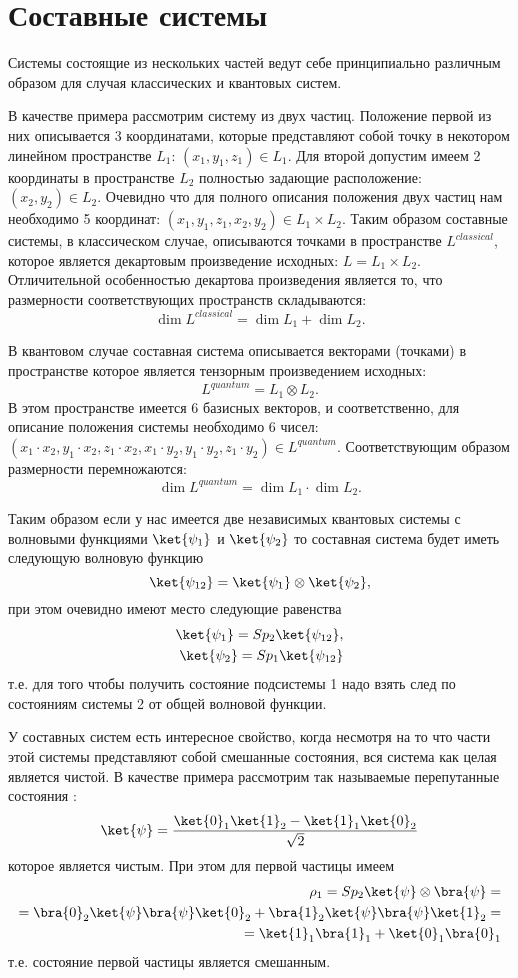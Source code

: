\section{Составные системы}
\label{sec:add:quantum:composite}
Системы состоящие из нескольких частей ведут себе принципиально
различным образом для случая классических и квантовых систем.


В качестве примера рассмотрим систему из двух частиц. Положение первой
из них описывается 3 координатами, которые представляют собой точку в
некотором линейном пространстве $L_1$: $(x_1, y_1, z_1) \in L_1$. Для второй
допустим имеем 2 координаты в пространстве $L_2$ полностью задающие
расположение:  
$(x_2, y_2) \in L_2$. Очевидно что для полного описания положения двух
частиц нам необходимо 5 координат: $(x_1, y_1, z_1, x_2, y_2) \in L_1
\times L_2$. Таким образом составные системы, в классическом случае,
описываются точками в пространстве $L^{classical}$, которое является декартовым
произведение исходных: $L = L_1 \times L_2$. Отличительной
особенностью декартова произведения является то, что размерности
соответствующих пространств складываются:
\[
\dim{L^{classical}} = \dim{L_1} + \dim{L_2}.
\] 

В квантовом случае составная система описывается векторами (точками) в
пространстве которое является тензорным произведением исходных: 
\[
L^{quantum} = L_1 \otimes L_2.
\]
В этом пространстве имеется 6 базисных векторов, и соответственно, для
описание положения системы необходимо 6 чисел:
$(x_1 \cdot x_2, y_1 \cdot x_2, z_1 \cdot x_2, 
x_1 \cdot y_2, y_1 \cdot y_2, z_1 \cdot y_2) \in L^{quantum}$. 
Соответствующим образом размерности перемножаются:
\[
\dim{L^{quantum}} = \dim{L_1} \cdot \dim{L_2}.
\] 

Таким образом если у нас имеется две независимых квантовых системы с
волновыми функциями $\ket{\psi_1}$ и $\ket{\psi_2}$ то составная
система будет иметь следующую волновую функцию
\[
\ket{\psi_{12}} = \ket{\psi_1} \otimes \ket{\psi_2},
\]
при этом очевидно имеют место следующие равенства 
\begin{eqnarray}
\ket{\psi_1} = Sp_2 \ket{\psi_{12}}, \\
\nonumber
\ket{\psi_2} = Sp_1 \ket{\psi_{12}} 
\nonumber
\end{eqnarray}
т.е. для того чтобы получить состояние подсистемы 1 надо взять след по
состояниям системы 2 от общей волновой функции. 

У составных систем есть интересное свойство, когда несмотря на то что
части этой системы представляют собой смешанные состояния, вся система
как целая является чистой. В качестве примера рассмотрим так
называемые перепутанные состояния :
\[
\ket{\psi} = \frac{\ket{0}_1\ket{1}_2 - \ket{1}_1\ket{0}_2}{\sqrt{2}}
\]
которое является чистым. При этом для первой частицы имеем
\begin{eqnarray}
\rho_1 = Sp_2 \ket{\psi} \otimes \bra{\psi} = 
\nonumber \\
=
\bra{0}_2\ket{\psi}\bra{\psi}\ket{0}_2 + 
\bra{1}_2\ket{\psi}\bra{\psi}\ket{1}_2 = 
\nonumber \\
= \ket{1}_1\bra{1}_1 + 
\ket{0}_1\bra{0}_1
\nonumber
\end{eqnarray}
т.е. состояние первой частицы является смешанным.
